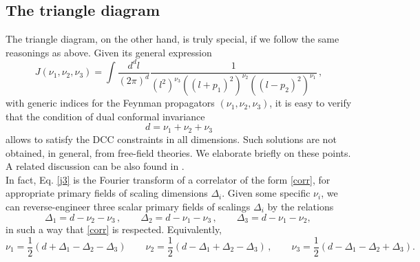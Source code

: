 \documentclass[a4paper,11pt,openright,twoside]{book}
\numberwithin{equation}{section}
\begin{document}
{\subsection{The triangle diagram}
The triangle diagram, on the other hand, is truly special, if we follow the same reasonings as above. Given its general expression
\begin{equation}
	\label{j3}
	J(\nu_1,\nu_2,\nu_3) = \int \frac{d^d l}{(2 \pi)^d} \frac{1}{(l^2)^{\nu_3} ((l+p_1)^2)^{\nu_2} ((l-p_2)^2)^{\nu_1}}\, ,
\end{equation}
with generic indices for the Feynman propagators $(\nu_1,\nu_2,\nu_3)$, it is easy to verify that the condition of dual 
conformal invariance 
\begin{equation}
	\label{dci}
	d=\nu_1+\nu_2 +\nu_3
\end{equation}
allows to satisfy the DCC constraints in all dimensions. Such solutions are not obtained, in general, from free-field theories. We elaborate briefly on these points. A related discussion can be also found in \cite{Bzowski:2015pba}.\\
In fact, Eq. \eqref{j3} is the Fourier transform of a correlator of the form \eqref{corr}, for appropriate primary fields of scaling dimensions $\Delta_i$. Given some specific $\nu_i$, we can reverse-engineer three scalar primary fields of scalings $\Delta_i$ by the relations
\begin{equation}
	\Delta_1 = d - \nu_2 - \nu_3 \,, \qquad
	\Delta_2 = d - \nu_1 - \nu_3 \,, \qquad
	\Delta_3 = d - \nu_1 - \nu_2, \,
\end{equation}
in such a way that \eqref{corr} is respected. Equivalently, 
\begin{equation}
	\nu_1= \frac{1}{2} (d + \Delta_1 -\Delta_2-\Delta_3) \qquad
	\nu_2 = \frac{1}{2}(d - \Delta_1 + \Delta_2 -\Delta_3)\,, \qquad
	\nu_3 = \frac{1}{2}(d - \Delta_1 - \Delta_2 +\Delta_3).
\end{equation}


}
\end{document}

